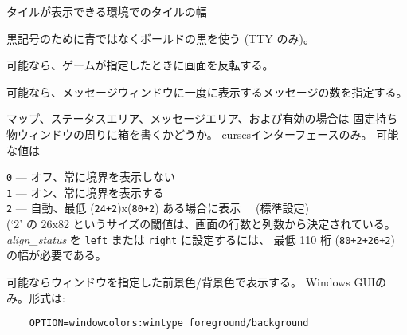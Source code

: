 タイルが表示できる環境でのタイルの幅
\item[\ib{use\verb+_+darkgray}]
黒記号のために青ではなくボールドの黒を使う (TTY のみ)。
\item[\ib{use\verb+_+inverse}]
可能なら、ゲームが指定したときに画面を反転する。
\item[\ib{vary\verb+_+msgcount}]
可能なら、メッセージウィンドウに一度に表示するメッセージの数を指定する。
\item[\ib{windowborders}]
マップ、ステータスエリア、メッセージエリア、および有効の場合は
固定持ち物ウィンドウの周りに箱を書くかどうか。
cursesインターフェースのみ。
可能な値は

{\tt 0} --- オフ、常に境界を表示しない\\
{\tt 1} --- オン、常に境界を表示する\\
{\tt 2} --- 自動、最低
(\verb&24+2&)x(\verb&80+2&) ある場合に表示 \ \ (標準設定)\\

(`2' の 26x82 というサイズの閾値は、画面の行数と列数から決定されている。
{\it align_status\/} を {\tt left} または {\tt right} に設定するには、
最低 110 桁 (\verb&80+2+26+2&) の幅が必要である。
\item[\ib{windowcolors}]
可能ならウィンドウを指定した前景色/背景色で表示する。
Windows GUIのみ。形式は:
\begin{verbatim}
    OPTION=windowcolors:wintype foreground/background
\end{verbatim}

